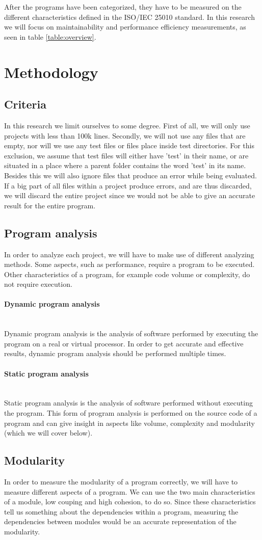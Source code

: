 \documentclass[twoside]{uva-inf-bachelor-thesis}
\newcommand{\myparagraph}[1]{\paragraph{#1}\mbox{}\\}
\begin{document}
After the programs have been categorized, they have to be measured on the different characteristics defined in the ISO/IEC 25010 standard. In this research we will focus on maintainability and performance efficiency measurements, as seen in table \ref{table:overview}.

\section{Methodology}
\subsection{Criteria}
In this research we limit ourselves to some degree. First of all, we will only use projects with less than 100k lines. Secondly, we will not use any files that are empty, nor will we use any test files or files place inside test directories. For this exclusion, we assume that test files will either have 'test' in their name, or are situated in a place where a parent folder contains the word 'test' in its name. Besides this we will also ignore files that produce an error while being evaluated. If a big part of all files within a project produce errors, and are thus discarded, we will discard the entire project since we would not be able to give an accurate result for the entire program.

\subsection{Program analysis}
In order to analyze each project, we will have to make use of different analyzing methods. Some aspects, such as performance, require a program to be executed. Other characteristics of a program, for example code volume or complexity, do not require execution.

\myparagraph{Dynamic program analysis}
Dynamic program analysis is the analysis of software performed by executing the program on a real or virtual processor. In order to get accurate and effective results, dynamic program analysis should be performed multiple times.

\myparagraph{Static program analysis}
Static program analysis is the analysis of software performed without executing the program. This form of program analysis is performed on the source code of a program and can give insight in aspects like volume, complexity and modularity (which we will cover below).

\subsection{Modularity}
In order to measure the modularity of a program correctly, we will have to measure different aspects of a program. We can use the two main characteristics of a module, low couping and high cohesion, to do so. Since these characteristics tell us something about the dependencies within a program, measuring the dependencies between modules would be an accurate representation of the modularity.
\end{document}
